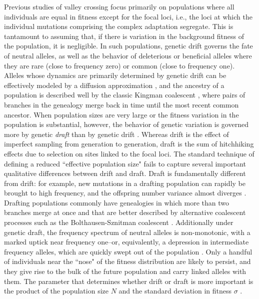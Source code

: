 \documentclass[rmp]{revtex4}
\begin{document}
\begin{spacing}{1.5}
Previous studies of valley crossing focus primarily on populations where all individuals are equal in fitness except for the focal loci, i.e., the loci at which the individual mutations comprising the complex adaptation segregate.
This is tantamount to assuming that, if there is variation in the background fitness of the population, it is negligible.
In such populations, genetic drift governs the fate of neutral alleles, as well as the behavior of deleterious or beneficial alleles where they are rare (close to frequency zero) or common (close to frequency one).
Alleles whose dynamics are primarily determined by genetic drift can be effectively modeled by a diffusion approximation \citep{Wright:1945,Kimura:1955,Kimura:1957}, and the ancestry of a population is described well by the classic Kingman coalescent \citep{Kingman:1982}, where pairs of branches in the genealogy merge back in time until the most recent common ancestor.
When population sizes are very large or the fitness variation in the population is substantial, however, the behavior of genetic variation is governed more by genetic \emph{draft} than by genetic drift \citep{gillespie_2000, gillespie_2001, masel_2011, neher_shraiman_2011}.
Whereas drift is the effect of imperfect sampling from generation to generation, draft is the sum of hitchhiking effects due to selection on sites linked to the focal loci.
The standard technique of defining a reduced ``effective population size" fails to capture several important qualitative differences between drift and draft.
Draft is fundamentally different from drift: for example, new mutations in a drafting population can rapidly be brought to high frequency, and the offspring number variance almost diverges \citep{neher_shraiman_2011}.
Drafting populations commonly have genealogies in which more than two branches merge at once and that are better described by alternative coalescent processes such as the Bolthausen-Sznitman coalescent \citep{neher_hallatschek_2013, brunet_2007, schweinsberg_2017}.
Additionally under genetic draft, the frequency spectrum of neutral alleles is non-monotonic, with a marked uptick near frequency one--or, equivalently, a depression in intermediate frequency alleles, which are quickly swept out of the population \citep{neher_shraiman_2011,kosheleva_2013,neher_hallatschek_2013}.
Only a handful of individuals near the ``nose" of the fitness distribution are likely to persist, and they give rise to the bulk of the future population and carry linked alleles with them.
The parameter that determines whether drift or draft is more important is the product of the population size $N$ and the standard deviation in fitness $\sigma$ \citep{neher_hallatschek_2013}.


\end{spacing}
\end{document}
